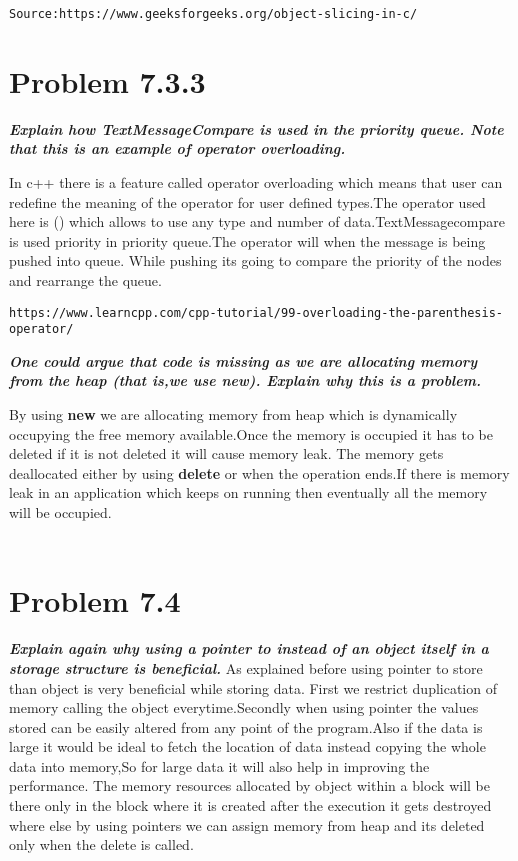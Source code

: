 \documentclass[a4paper,11pt]{article}
\theoremstyle{mytheor}
\begin{document}
\texttt{Source:https://www.geeksforgeeks.org/object-slicing-in-c/}

\section*{Problem 7.3.3}
\textbf{\textit{Explain how TextMessageCompare is used in the priority queue. Note that this is an example of operator overloading.}}

In c++ there is a feature called operator overloading which means that user can redefine the meaning of the operator for user defined types.The operator used here is () which allows to use any type and number of data.TextMessagecompare is used priority in priority queue.The operator will when the message is being pushed into queue. While pushing its going to compare the priority of the nodes and rearrange the queue.

\texttt{https://www.learncpp.com/cpp-tutorial/99-overloading-the-parenthesis-operator/}


\textbf{\textit{One could argue that code is missing as we are allocating memory from the heap (that is,we use new). Explain why this is a problem.}}

By using \textbf{new} we are allocating memory from heap which is dynamically occupying the free memory available.Once the memory is occupied it has to be deleted if it is not deleted it will cause memory leak. The memory gets deallocated either by using \textbf{delete} or when the operation ends.If there is memory leak in an application which keeps on running then eventually all the memory will be occupied.
\\
\\
\section*{Problem 7.4}

\textbf{\textit{Explain again why using a pointer to instead of an object itself in a storage structure is beneficial.}}
As explained before using pointer to store than object is very beneficial while storing data. First we restrict duplication of memory calling the object everytime.Secondly when using pointer the values stored can be easily altered from any point of the program.Also if the data is large it would be ideal to fetch the location of data instead copying the whole data into memory,So for large data it will also help in improving the performance. The memory resources allocated by object within a block will be there only in the block where it is created  after the execution  it gets destroyed where else by using pointers we can assign memory from heap and its deleted only when the delete is called.
\\
\end{document}
